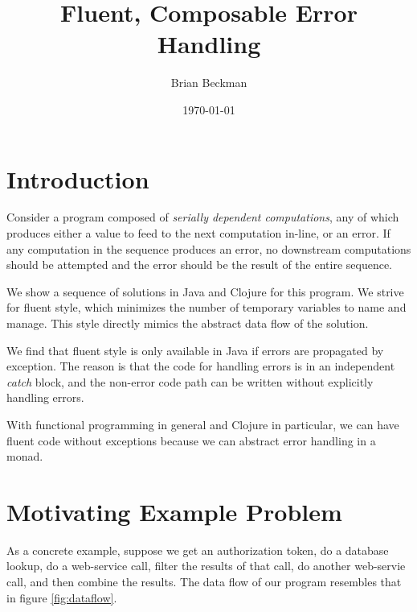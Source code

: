 \documentclass[11pt]{article}
\author{Brian Beckman}
\date{\today}
\title{Fluent, Composable Error Handling}
\begin{document}
\maketitle
\tableofcontents


\section{Introduction}
\label{sec-1}

Consider a program composed of \emph{serially dependent computations},
any of which produces either a value to feed to the next computation
in-line, or an error. If any computation in the sequence produces an
error, no downstream computations should be attempted and the error
should be the result of the entire sequence.

We show a sequence of solutions in Java and Clojure for this
program. We strive for fluent style, which minimizes the number of
temporary variables to name and manage. This style directly mimics
the abstract data flow of the solution.

We find that fluent style is only available in Java if errors are
propagated by exception. The reason is that the code for handling
errors is in an independent \emph{catch} block, and the non-error code
path can be written without explicitly handling errors.

With functional programming in general and Clojure in particular, we
can have fluent code without exceptions because we can abstract
error handling in a monad. 
\section{Motivating Example Problem}
\label{sec-2}

As a concrete example, suppose we get an authorization token, do a
database lookup, do a web-service call, filter the results of that
call, do another web-servie call, and then combine the results. The
data flow of our program resembles that in figure
\ref{fig:dataflow}.
\end{document}
